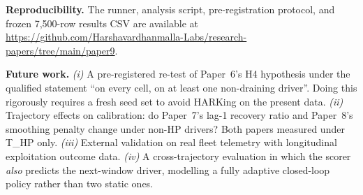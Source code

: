 \textbf{Reproducibility.} The runner, analysis script, pre-registration
protocol, and frozen 7{,}500-row results CSV are available at
\url{https://github.com/Harshavardhanmalla-Labs/research-papers/tree/main/paper9}.

\textbf{Future work.}
\textit{(i)} A pre-registered re-test of Paper~6's H4 hypothesis under
the qualified statement ``on every cell, on at least one non-draining
driver''. Doing this rigorously requires a fresh seed set to avoid
HARKing on the present data.
\textit{(ii)} Trajectory effects on calibration: do Paper~7's lag-1
recovery ratio and Paper~8's smoothing penalty change under non-HP
drivers? Both papers measured under T\_HP only.
\textit{(iii)} External validation on real fleet telemetry with
longitudinal exploitation outcome data.
\textit{(iv)} A cross-trajectory evaluation in which the scorer
\textit{also} predicts the next-window driver, modelling a fully
adaptive closed-loop policy rather than two static ones.
